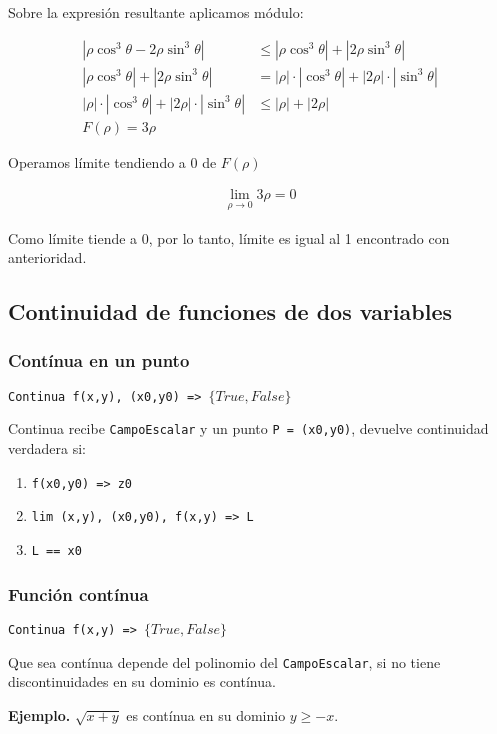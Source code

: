 Sobre la expresión resultante aplicamos módulo:

\begin{align*}
    |\rho\cos^{3}\theta - 2\rho\sin^{3}\theta|                 & \leq |\rho\cos^{3}\theta| + |2\rho\sin^{3}\theta|            \\
    |\rho\cos^{3}\theta| + |2\rho\sin^{3}\theta|               & = |\rho|\cdot|\cos^{3}\theta| + |2\rho|\cdot|\sin^{3}\theta| \\
    |\rho|\cdot|\cos^{3}\theta| + |2\rho|\cdot|\sin^{3}\theta| & \leq |\rho| + |2\rho|                                        \\
    \boxed{F(\rho) = 3\rho}
\end{align*}

Operamos límite tendiendo a 0 de \(F(\rho)\)

\begin{align*}
    \lim_{\rho\to0} 3\rho = \boxed{0}
\end{align*}

Como límite tiende a 0, por lo tanto, límite es igual al 1 encontrado con anterioridad.

\subsection{Continuidad de funciones de dos variables}

\subsubsection{Contínua en un punto}

\texttt{Continua f(x,y), (x0,y0) => \(\{True, False\}\)}

Continua recibe \texttt{CampoEscalar} y un punto \texttt{P = (x0,y0)},
devuelve continuidad verdadera si:

\begin{enumerate}
    \item \texttt{f(x0,y0) => z0}
    \item \texttt{lim (x,y), (x0,y0), f(x,y) => L}
    \item \texttt{L == x0}
\end{enumerate}

\subsubsection{Función contínua}

\texttt{Continua f(x,y) => \(\{True, False\}\)}

Que sea contínua depende del polinomio del \texttt{CampoEscalar},
si no tiene discontinuidades en su dominio es contínua.

\textbf{Ejemplo.}
\(\sqrt{x+y}\) es contínua en su dominio \(y \geq -x\).